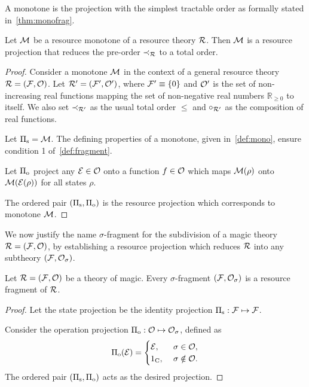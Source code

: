 A monotone is the projection with the simplest tractable order as formally stated in~\cref{thm:monofrag}.
\begin{proposition}\label{thm:monofrag}
	Let $\mathcal{M}$ be a resource monotone of a resource theory $\mathcal{R}$. 
	Then $\mathcal{M}$ is a resource projection that reduces the pre-order $\prec_{\mathcal{R}}$ to a total order.
\end{proposition}
\begin{proof}
	Consider a monotone $\mathcal{M}$ in the context of a general resource theory $\mathcal{R} = (\mathcal{F}, \mathcal{O})$.
	Let $\mathcal{R}' = (\mathcal{F}', \mathcal{O}')$, where $\mathcal{F}' \equiv \{0\}$ and $\mathcal{O}'$ is the set of non-increasing real functions mapping the set of non-negative real numbers $\mathbb{R}_{\geq 0}$ to itself. 
	We also set $\prec_{\mathcal{R}'}$ as the usual total order $\leq$ and $\circ_{\mathcal{R}'}$ as the composition of real functions.
	
	Let $\Pi_{\rm{s}} = \mathcal{M}$.
	The defining properties of a monotone, given in~\cref{def:mono}, ensure condition 1 of~\cref{def:fragment}.
	
	Let $\Pi_{\rm{o}}$ project any $\mathcal{E} \in \mathcal{O}$ onto a function $f \in \mathcal{O}$ which maps $\mathcal{M}(\rho)$ onto $\mathcal{M}(\mathcal{E}(\rho))$ for all states $\rho$.
	
	The ordered pair $(\Pi_{\rm{s}}, \Pi_{\rm{o}})$ is the resource projection which corresponds to monotone $\mathcal{M}$.
\end{proof}

We now justify the name $\sigma$-fragment for the subdivision of a magic theory $\mathcal{R} = (\mathcal{F}, \mathcal{O})$, by establishing a resource projection which reduces $\mathcal{R}$ into any subtheory $(\mathcal{F}, \mathcal{O}_\sigma)$.
\begin{proposition}
    Let $\mathcal{R} = (\mathcal{F}, \mathcal{O})$ be a theory of magic.
    Every $\sigma$-fragment $(\mathcal{F}, \mathcal{O}_\sigma)$ is a resource fragment of $\mathcal{R}$.
\end{proposition}
\begin{proof}
    Let the state projection be the identity projection $\Pi_{\rm{s}}:\mathcal{F}\mapsto\mathcal{F}$.
    
    Consider the operation projection $\Pi_{\rm{o}}:\mathcal{O} \mapsto \mathcal{O}_\sigma$, defined as
    \begin{equation}
    \Pi_{\rm{o}}(\mathcal{E}) =
    \begin{cases}
        \mathcal{E},\ &\sigma \in \mathcal{O}, \\
        1_{\rm{C}},\ &\sigma \notin \mathcal{O}.
    \end{cases}
    \end{equation}
    The ordered pair $(\Pi_{\rm{s}}, \Pi_{\rm{o}})$ acts as the desired projection.
\end{proof}


